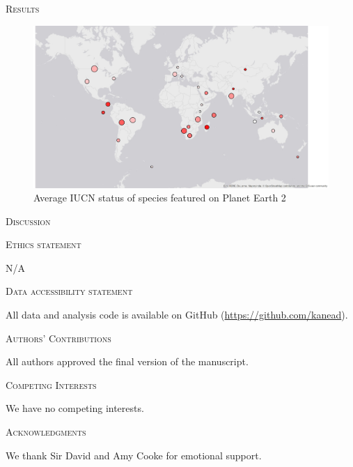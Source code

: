 \documentclass[12pt,letterpaper]{article}
\renewcommand{\section}[1]{%
\bigskip
\begin{center}
\begin{Large}
\normalfont\scshape #1
\medskip
\end{Large}
\end{center}}
\begin{document}
\section{Results}

\begin{figure}[H]
\centering
    \includegraphics[keepaspectratio, totalheight=0.5 \textheight]{map2.jpg}
\caption{Average IUCN status of species featured on Planet Earth 2}
\label{info.diff}
\end{figure}


%
%

\section{Discussion}

\section{Ethics statement}
N/A
\section{Data accessibility statement}
All data and analysis code is available on GitHub (\url{https://github.com/kanead}).
\section{Authors' Contributions}
All authors approved the final version of the manuscript.
\section{Competing Interests}
We have no competing interests.
\section{Acknowledgments}
We thank Sir David and Amy Cooke for emotional support.




\end{document}
